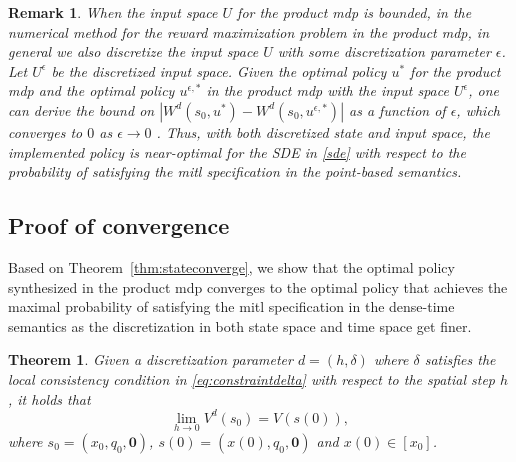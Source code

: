 \documentclass[letterpaper, 10 pt, conference]{ieeeconf}
\newtheorem{remark}{Remark}
\newtheorem{theorem}{Theorem}
\providecommand{\abs}[1]{\left|#1\right|}
\begin{document}
\begin{remark}
  When the input space $U$ for the product \ac{mdp} is bounded, in the
  numerical method for the reward maximization problem in the product
  \ac{mdp}, in general we also discretize the input space $U$ with
  some discretization parameter $\epsilon$. Let $U^\epsilon$ be the
  discretized input space. Given the optimal policy $u^\ast$ for the
  product \ac{mdp} and the optimal policy $u^{\epsilon, \ast}$ in the
  product \ac{mdp} with the input space $U^\epsilon$, one can derive
  the bound on $\abs{W^d(s_0, u^\ast) - W^d(s_0, u^{\epsilon,\ast})}$
  as a function of $\epsilon$, which converges to $0$ as
  $\epsilon \rightarrow 0$
  \cite{fleming2006controlled,kushner2001numerical}.  Thus, with both
  discretized state and input space, the implemented policy is
  near-optimal for the SDE in \eqref{sde} with respect to the
  probability of satisfying the \ac{mitl} specification in the
  point-based semantics.
\end{remark}

 \subsection{Proof of convergence}
Based on Theorem~\ref{thm:stateconverge}, we show that the optimal
 policy synthesized in the product \ac{mdp} converges to the
 optimal policy that achieves the maximal probability of satisfying
 the \ac{mitl} specification in the dense-time semantics as the
 discretization in both state space and time space get finer.
\begin{theorem}
  Given a discretization parameter $d= (h,\delta)$ where $\delta$
  satisfies the local consistency condition in
  \eqref{eq:constraintdelta} with respect to the spatial step $h$, it
  holds that
  \[ \lim_{h \rightarrow 0}V^d(s_0) = V(s(0)),
\]
where $s_0 = (x_0, q_0, \bm 0)$, $s(0) = (x (0), q_0, \bm 0)$ and
$x(0)\in [x_0]$.
\end{theorem}
\end{document}
